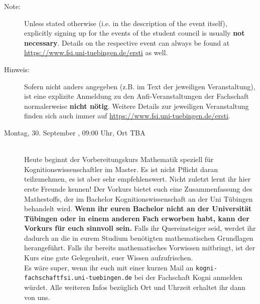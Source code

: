 \begin{description}
  \ifml
    \item[Note:] Unless stated otherwise (i.e. in the description of the event itself), explicitly signing up for the events of the student council is usually \textbf{not necessary}. Details on the respective event can always be found at \url{https://www.fsi.uni-tuebingen.de/ersti} as well.
  \else
    \item[Hinweis:] Sofern nicht anders angegeben (z.B. im Text der jeweiligen Veranstaltung), ist eine explizite Anmeldung zu den Anfi-Veranstaltungen der Fachschaft normalerweise \textbf{nicht nötig}. Weitere Details zur jeweiligen Veranstaltung finden sich auch immer auf \url{https://www.fsi.uni-tuebingen.de/ersti}.
  \fi

\ifkogwiss
    \ifmaster
        \item[Montag, 30. September \YEAR, 09:00 Uhr, Ort TBA ]\ \\
        Heute beginnt der Vorbereitungskurs Mathematik speziell für Kognitionswissenschaftler im Master. Es ist nicht Pflicht daran teilzunehmen, es ist aber sehr empfehlenswert. Nicht zuletzt lernt ihr hier erste Freunde kennen! Der Vorkurs bietet euch eine Zusammenfassung des Mathestoffs, der im Bachelor Kognitionswissenschaft an der Uni Tübingen behandelt wird.
        \textbf{Wenn ihr euren Bachelor nicht an der Universität Tübingen oder in einem anderen Fach erworben habt, kann der Vorkurs für euch sinnvoll sein.} Falls ihr Quereinsteiger seid, werdet ihr dadurch an die in eurem Studium benötigten mathematischen Grundlagen herangeführt. Falls ihr bereits mathematisches Vorwissen mitbringt, ist der Kurs eine gute Gelegenheit, euer Wissen aufzufrischen.\\
         Es wäre super, wenn ihr euch mit einer kurzen Mail an \texttt{kogni-fachschaft\At fsi.uni-tuebingen.de} bei der Fachschaft Kogni anmelden würdet. Alle weiteren Infos bezüglich Ort und Uhrzeit erhaltet ihr dann von uns.\\

%
%
    \fi
\fi


\end{description}
